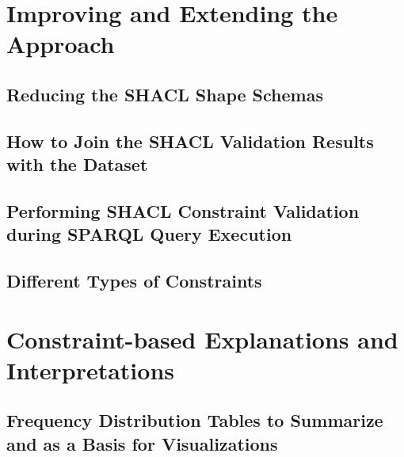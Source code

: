 \documentclass[11pt,a4paper, DIV=12]{report}
\begin{document}
    \section{Improving and Extending the Approach}                          
        \label{section_improving_approach}
        

        \subsection{Reducing the SHACL Shape Schemas}
            \label{section_shaclapi}
            
        
        \subsection{How to Join the SHACL Validation Results with the Dataset}
            \label{section_executing_the_join}
            
        
        \subsection{Performing SHACL Constraint Validation during SPARQL Query Execution}
            \label{section_valSPARQL}
            

        \subsection{Different Types of Constraints}
            \label{section_further_types_of_constraints}
            
    
    \section{Constraint-based Explanations and Interpretations}
        \label{section_constraint_based_explanations}
        
        \subsection{Frequency Distribution Tables to Summarize and as a Basis for Visualizations}
            
            \label{section_frequency_distribution_tables}
\end{document}
